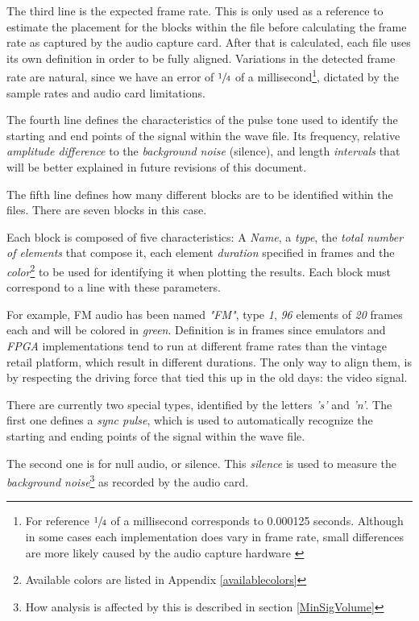 \documentclass[10pt,a4paper]{report}
\begin{document}
The third line is the expected frame rate. This is only used as a reference to estimate the placement for the blocks within the file before calculating the frame rate as captured by the audio capture card. After that is calculated, each file uses its own definition in order to be fully aligned. Variations in the detected frame rate are natural, since we have an error of $\sfrac{1}{4}$ of a millisecond\footnote{For reference $\sfrac{1}{4}$ of a millisecond corresponds to 0.000125 seconds. Although in some cases each implementation does vary in frame rate, small differences are more likely caused by the audio capture hardware \cite{SoundCardClock}}, dictated by the sample rates and audio card limitations.

The fourth line defines the characteristics of the pulse tone used to identify the starting and end points of the signal within the wave file. Its frequency, relative \textit{amplitude difference} to the \textit{background noise} (silence), and length \textit{intervals} that will be better explained in future revisions of this document.

The fifth line defines how many different blocks are to be identified within the files. There are seven blocks in this case.

Each block is composed of five characteristics: A \textit{Name}, a \textit{type}, the \textit{total number of elements} that compose it, each element \textit{duration} specified in frames and the \textit{color}\footnote{Available colors are listed in Appendix \ref{availablecolors}} to be used for identifying it when plotting the results. Each block must correspond to a line with these parameters.

For example, FM audio has been named \textit{"FM"}, type \textit{1}, \textit{96} elements of \textit{20} frames each and will be colored in \textit{green}. Definition is in frames since emulators and \textit{FPGA} implementations tend to run at different frame rates than the vintage retail platform, which result in different durations. The only way to align them, is by respecting the driving force that tied this up in the old days: the video signal.

There are currently two special types, identified by the letters \textit{'s'} and \textit{'n'}. The first one defines a \textit{sync pulse}, which is used to automatically recognize the starting and ending points of the signal within the wave file. 

The second one is for null audio, or silence. This \textit{silence} is used to measure the \textit{background noise}\footnote{How analysis is affected by this is described in section \ref{MinSigVolume}} as recorded by the audio card. 
\end{document}
